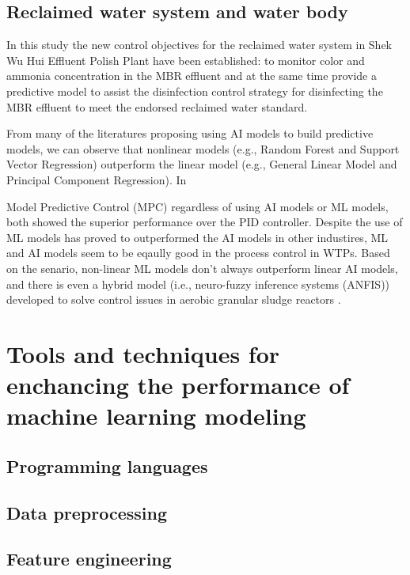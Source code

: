 \subsection{Reclaimed water system and water body}

In this study the new control objectives for the reclaimed water system in Shek Wu Hui Effluent Polish Plant have been established: to monitor color and ammonia concentration in the MBR effluent and at the same time provide a predictive model to assist the disinfection control strategy for disinfecting the MBR effluent to meet the endorsed reclaimed water standard.

From many of the literatures proposing using AI models to build predictive models, we can observe that nonlinear models (e.g., Random Forest and Support Vector Regression) outperform the linear model (e.g., General Linear Model and Principal Component Regression). In 

Model Predictive Control (MPC) regardless of using AI models or ML models, both showed the superior performance over the PID controller. Despite the use of ML models has proved to outperformed the AI models in other industires, ML and AI models seem to be eqaully good in the process control in WTPs. Based on the senario, non-linear ML models don't always outperform linear AI models, and there is even a hybrid model (i.e., neuro-fuzzy inference systems (ANFIS)) developed to solve control issues in aerobic granular sludge reactors \citep{zaghloulDevelopmentEnsembleMachine2021}.
\section{Tools and techniques for enchancing the performance of machine learning modeling}
\subsection{Programming languages}
\subsection{Data preprocessing}

\subsection{Feature engineering}

